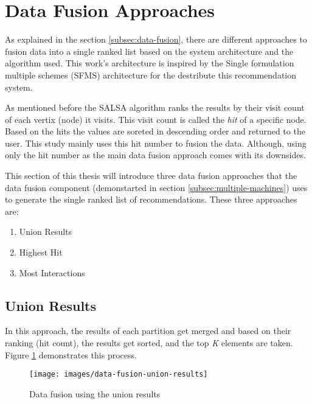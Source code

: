 \section{Data Fusion Approaches}
\label{sec:data-fusion-approaches}
As explained in the section \ref{subsec:data-fusion}, there are different approaches to fusion data into a single ranked list based on the system architecture and the algorithm used. This work's architecture is inspired by the Single formulation multiple schemes (SFMS) architecture for the destribute this recommendation system. 


As mentioned before the SALSA algorithm ranks the results by their visit count of each vertix (node) it visits. This visit count is called the \emph{hit} of a specific node. Based on the hits the values are soreted in descending order and returned to the user. This study mainly uses this hit number to fusion the data. Although, using only the hit number as the main data fusion approach comes with its downsides.


This section of this thesis will introduce three data fusion approaches that the data fusion component (demonstarted in section \ref{subsec:multiple-machines}) uses to generate the single ranked list of recommendations. These three approaches are:

\begin{enumerate}
	\item Union Results
	\item Highest Hit
	\item Most Interactions
\end{enumerate}

\subsection{Union Results}
\label{subsec:data-fusion-union-results}
In this approach, the results of each partition get merged and based on their ranking (hit count), the results get sorted, and the top \emph{K} elements are taken. Figure \ref{fig:data-fusion-union-results} demonstrates this process.


\begin{figure}[!hb]
	\centering
	\texttt{[image: images/data-fusion-union-results]}
	\caption{Data fusion using the union results}
	\label{fig:data-fusion-union-results}
\end{figure}

